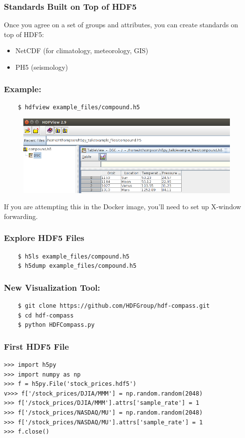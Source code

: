 \documentclass[9pt]{beamer}
\begin{document}
\begin{frame}[fragile]
  \frametitle{Standards Built on Top of HDF5}
  Once you agree on a set of groups and attributes, you can create standards on top of HDF5:
  \begin{itemize}
  \item NetCDF (for climatology, meteorology, GIS)
  \item PH5 (seismology)
  \end{itemize}
\end{frame}



\begin{frame}[fragile]
  \frametitle{Example:}

  \begin{verbatim}
    $ hdfview example_files/compound.h5
  \end{verbatim}
  \begin{figure}
    \includegraphics[scale=0.3]{fig/hdfview.png}
  \end{figure}
  \pause
  If you are attempting this in the Docker image, you'll need to set up X-window forwarding.
\end{frame}

\begin{frame}[fragile]
  \frametitle{Explore HDF5 Files}
  \begin{verbatim}
    $ h5ls example_files/compound.h5
    $ h5dump example_files/compound.h5
  \end{verbatim}
\end{frame}

\begin{frame}[fragile]
  \frametitle{New Visualization Tool:}
  \begin{verbatim}
    $ git clone https://github.com/HDFGroup/hdf-compass.git
    $ cd hdf-compass
    $ python HDFCompass.py
  \end{verbatim}
\end{frame}


\begin{frame}[fragile]
\frametitle{First HDF5 File}
\begin{verbatim}
>>> import h5py
>>> import numpy as np
>>> f = h5py.File('stock_prices.hdf5')
v>>> f['/stock_prices/DJIA/MMM'] = np.random.random(2048)
>>> f['/stock_prices/DJIA/MMM'].attrs['sample_rate'] = 1
>>> f['/stock_prices/NASDAQ/MU'] = np.random.random(2048)
>>> f['/stock_prices/NASDAQ/MU'].attrs['sample_rate'] = 1
>>> f.close()
\end{verbatim}
\end{frame}
\end{document}
